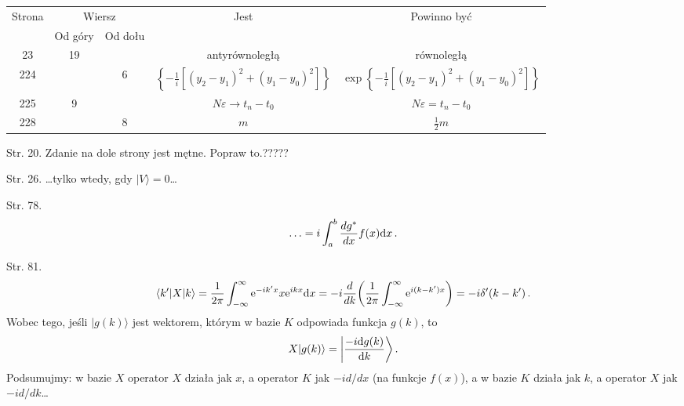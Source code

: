 \documentclass[a4paper,11pt]{article}
\begin{document}
\begin{center}

  \begin{tabular}{|c|c|c|c|c|}
    \hline
    Strona & \multicolumn{2}{c|}{Wiersz} & Jest
                              & Powinno być \\ \cline{2-3}
    & Od góry & Od dołu & & \\
    \hline
    23 & 19 & & antyrównoległą & równoległą \\
    224 & & 6 & $\left\{ -\frac{ 1 }{ i } [ ( y_{ 2  } - y_{ 1 } )^{ 2 }
                + ( y_{ 1 } - y_{ 0 } )^{ 2 } ] \right\}$
           & $\exp\left\{ -\frac{ 1 }{ i } [ ( y_{ 2  } - y_{ 1 } )^{ 2 }
             + ( y_{ 1 } - y_{ 0 } )^{ 2 } ] \right\}$ \\
    225 & 9 & & $N \varepsilon \to t_{ n } - t_{ 0 }$
           & $N \varepsilon = t_{ n } - t_{ 0 }$ \\
    228 & & 8 & $m$ & $\frac{ 1 }{ 2 } m$ \\
    \hline
  \end{tabular}

\end{center}


\noindent
Str. 20. Zdanie na dole strony jest mętne. Popraw to.?????

Str. 26. \ldots tylko wtedy, gdy $| V \rangle = 0$\ldots

Str. 78. %
$$\ldots = i \int_{a}^{b} \frac{ dg^{ * } }{ dx } f( x ) \mathrm{d} x \, .$$

Str. 81.
  $$\langle k' | X | k \rangle = \frac{ 1 }{ 2 \pi } \int_{ -\infty
  }^{ \infty } \mathrm{e}^{ -i k' x } x \mathrm{e}^{ i k x } \mathrm{d} x = -i \frac{ d }{ dk } \bigg( \frac{ 1 }{ 2 \pi } \int_{ -\infty }^{ \infty } \mathrm{e}^{ i ( k - k' ) x } \bigg) = -i \delta'( k - k' ) \, .$$ Wobec
  tego, jeśli $| g( k ) \rangle$ jest wektorem, którym w bazie $K$
  odpowiada funkcja $g( k )$, to
$$X| g( k ) \rangle = \bigg| \frac{ -i \mathrm{d} g( k ) }{ \mathrm{d} k } \bigg\rangle \, .$$
Podsumujmy: w bazie $X$ operator $X$ działa jak $x$, a operator $K$
jak $-i d / d x$ (na funkcje $f( x )$), a w bazie $K$ działa jak
$k$, a operator $X$ jak $-i d / d k$\ldots


\vspace{\spaceTwo}
\end{document}
